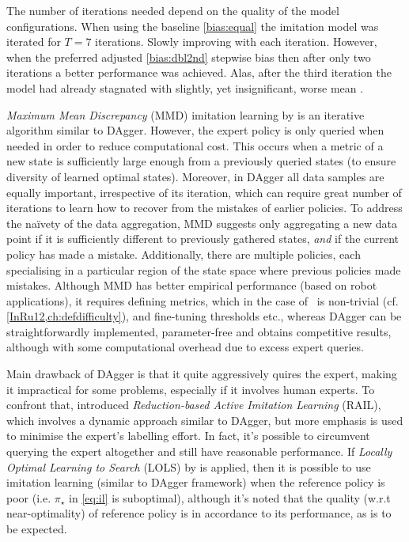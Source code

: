 The number of iterations needed depend on the quality of the model 
configurations. When using the baseline \ref{bias:equal} the imitation model 
was iterated for $T=7$ iterations. Slowly improving with each iteration.
However, when the preferred adjusted \ref{bias:dbl2nd} stepwise bias then after 
only two iterations a better performance was achieved. Alas, after the third 
iteration the model had already stagnated with slightly, yet insignificant, 
worse mean \namerho.

\emph{Maximum Mean Discrepancy} (MMD) imitation learning by \cite{Kim13} is an 
iterative algorithm similar to DAgger. 
However, the expert policy is only queried when needed in order to reduce 
computational cost. 
This occurs when a metric of a new state is sufficiently large enough from a 
previously queried states (to ensure diversity of learned optimal states). 
Moreover, in DAgger all data samples are equally important, irrespective of its 
iteration, which can require great number of iterations to learn how to recover 
from the mistakes of earlier policies. To address the na\"ivety of the data 
aggregation, MMD suggests only aggregating a new data point 
if it is sufficiently different to previously gathered states, \emph{and} if 
the current policy has made a mistake. 
Additionally, there are multiple policies, each specialising in a particular 
region of the state space where previous policies made mistakes.
Although MMD has better empirical performance (based on robot applications), it 
requires defining metrics, which in the case of \jsp\ is non-trivial (cf. 
\cref{InRu12,ch:defdifficulty}), and fine-tuning thresholds etc., whereas 
DAgger can be straightforwardly implemented, parameter-free and obtains 
competitive results, although with some computational overhead due to excess 
expert queries. 

Main drawback of DAgger is that it quite aggressively quires the expert, making 
it impractical for some problems, especially if it involves human experts. 
To confront that, \cite{Judah12} introduced \emph{Reduction-based Active 
Imitation Learning} (RAIL), which involves a dynamic approach similar to 
DAgger, but more emphasis is used to minimise the expert's labelling effort.
In fact, it's possible to circumvent querying the expert altogether and still 
have reasonable performance. If \emph{Locally Optimal Learning to 
Search} (LOLS) by \cite{ChangKADL15} is applied, then it is possible to use 
imitation learning (similar to DAgger framework) when the reference policy is 
poor (i.e. $\pi_\star$ in \cref{eq:il} is suboptimal), 
although it's noted that the quality (w.r.t near-optimality) of reference 
policy is in accordance to its performance, as is to be expected. 


